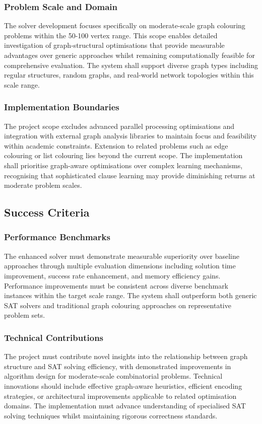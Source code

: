\subsubsection{Problem Scale and Domain}
The solver development focuses specifically on moderate-scale graph colouring problems within the 50-100 vertex range. This scope enables detailed investigation of graph-structural optimisations that provide measurable advantages over generic approaches whilst remaining computationally feasible for comprehensive evaluation. The system shall support diverse graph types including regular structures, random graphs, and real-world network topologies within this scale range.

\subsubsection{Implementation Boundaries}
The project scope excludes advanced parallel processing optimisations and integration with external graph analysis libraries to maintain focus and feasibility within academic constraints. Extension to related problems such as edge colouring or list colouring lies beyond the current scope. The implementation shall prioritise graph-aware optimisations over complex learning mechanisms, recognising that sophisticated clause learning may provide diminishing returns at moderate problem scales.

\subsection{Success Criteria}

\subsubsection{Performance Benchmarks}
The enhanced solver must demonstrate measurable superiority over baseline approaches through multiple evaluation dimensions including solution time improvement, success rate enhancement, and memory efficiency gains. Performance improvements must be consistent across diverse benchmark instances within the target scale range. The system shall outperform both generic SAT solvers and traditional graph colouring approaches on representative problem sets.

\subsubsection{Technical Contributions}
The project must contribute novel insights into the relationship between graph structure and SAT solving efficiency, with demonstrated improvements in algorithm design for moderate-scale combinatorial problems. Technical innovations should include effective graph-aware heuristics, efficient encoding strategies, or architectural improvements applicable to related optimisation domains. The implementation must advance understanding of specialised SAT solving techniques whilst maintaining rigorous correctness standards.